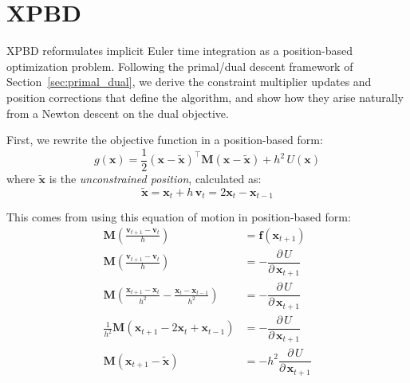 \documentclass{article}
\newcommand{\pd}[2]{\dfrac{\partial\, #1}{\partial\, #2}}
\begin{document}
\newpage

\section{XPBD \cite{macklin2016xpbd}}
\label{sec:xpbd}

XPBD reformulates implicit Euler time integration as a position-based optimization problem. Following the primal/dual descent framework of Section~\ref{sec:primal_dual}, we derive the constraint multiplier updates and position corrections that define the algorithm, and show how they arise naturally from a Newton descent on the dual objective.

\vspace{1ex}

First, we rewrite the objective function in a position-based form:
\begin{equation}
g(\mathbf{x}) = \frac{1}{2}(\mathbf{x} - \tilde{\mathbf{x}})^\top\mathbf{M}(\mathbf{x} - \tilde{\mathbf{x}}) + h^2\,U(\mathbf{x})
\end{equation}
where $\tilde{\mathbf{x}}$ is the \textit{unconstrained position}, calculated as:
\begin{equation}
\tilde{\mathbf{x}} = 
    \mathbf{x}_t + h\, \mathbf{v}_{t} =  2\mathbf{x}_t - \mathbf{x}_{t-1}
\end{equation}
\begin{derivation}
This comes from using this equation of motion in position-based form:
\begin{equation*}
\begin{aligned}
    \mathbf{M}\left(\frac{\mathbf{v}_{t+1} - \mathbf{v}_t}{h}\right) &= \mathbf{f}(\mathbf{x}_{t+1}) \\[1.5ex]
    \mathbf{M}\left(\frac{\mathbf{v}_{t+1} - \mathbf{v}_t}{h}\right) &= -\pd{U}{\mathbf{x}_{t+1}}    \\[1.5ex]
    \mathbf{M}\left(\frac{\mathbf{x}_{t+1} - \mathbf{x}_t}{h^2} - \frac{\mathbf{x}_{t} - \mathbf{x}_{t-1}}{h^2}\right) &= -\pd{U}{\mathbf{x}_{t+1}} \\[1.5ex]
    \frac{1}{h^2}\mathbf{M}\left(\mathbf{x}_{t+1} - 2\mathbf{x}_t + \mathbf{x}_{t-1}\right) &= -\pd{U}{\mathbf{x}_{t+1}} \\[1.5ex]
    \mathbf{M}\left(\mathbf{x}_{t+1} - \tilde{\mathbf{x}}\right) &= -h^2\pd{U}{\mathbf{x}_{t+1}} \\[1.5ex]
\end{aligned}
\end{equation*}
\end{derivation}
\end{document}
